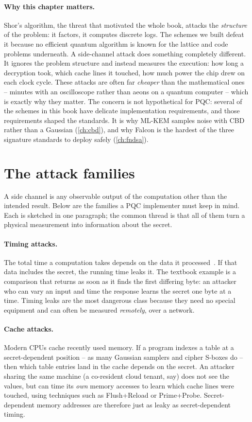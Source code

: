 \paragraph{Why this chapter matters.}
Shor's algorithm, the threat that motivated the whole book, attacks the
\emph{structure} of the problem: it factors, it computes discrete logs. The schemes
we built defeat it because no efficient quantum algorithm is known for the lattice
and code problems underneath. A side-channel attack does something completely
different. It ignores the problem structure and instead measures the execution:
how long a decryption took, which cache lines it touched, how much power the chip
drew on each clock cycle. These attacks are often far \emph{cheaper} than the
mathematical ones -- minutes with an oscilloscope rather than aeons on a quantum
computer -- which is exactly why they matter. The concern is not hypothetical for
PQC: several of the schemes in this book have delicate implementation requirements,
and those requirements shaped the standards. It is why ML-KEM samples noise with CBD
rather than a Gaussian (\ref{ch:cbd}), and why Falcon is the hardest of the three
signature standards to deploy safely (\ref{ch:fndsa}).

\section{The attack families}

A side channel is any observable output of the computation other than the intended
result. Below are the families a PQC implementer must keep in mind. Each is sketched
in one paragraph; the common thread is that all of them turn a physical measurement
into information about the secret.

\paragraph{Timing attacks.}
The total time a computation takes depends on the data it processed~\cite{kocher1996}. If that data
includes the secret, the running time leaks it. The textbook example is a
comparison that returns as soon as it finds the first differing byte: an attacker
who can vary an input and time the response learns the secret one byte at a time.
Timing leaks are the most dangerous class because they need no special equipment
and can often be measured \emph{remotely}, over a network.

\paragraph{Cache attacks.}
Modern CPUs cache recently used memory. If a program indexes a table at a
secret-dependent position -- as many Gaussian samplers and cipher S-boxes do -- then
which table entries land in the cache depends on the secret. An attacker sharing the
same machine (a co-resident cloud tenant, say) does not see the values, but can time
its \emph{own} memory accesses to learn which cache lines were touched, using
techniques such as Flush+Reload or Prime+Probe. Secret-dependent memory addresses are
therefore just as leaky as secret-dependent timing.

